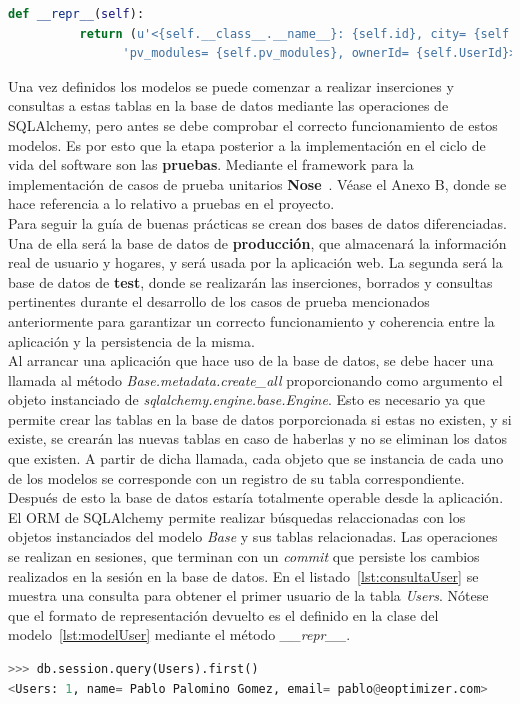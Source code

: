 \begin{itemize}
\begin{lstlisting}[language=Python,float=ht,caption={Modelo \textit{Home}},label={lst:modelHome}]
      def __repr__(self):
          return (u'<{self.__class__.__name__}: {self.id}, city= {self.city_code}, ' \
                'pv_modules= {self.pv_modules}, ownerId= {self.UserId}>'.format(self=self))
\end{lstlisting}
\end{itemize}
Una vez definidos los modelos se puede comenzar a realizar inserciones y consultas a estas tablas en la base de datos mediante las operaciones de SQLAlchemy, pero antes se debe comprobar el correcto funcionamiento de estos modelos. Es por esto que la etapa posterior a la implementación en el ciclo de vida del software son las \textbf{pruebas}. Mediante el framework para la implementación de casos de prueba unitarios \textbf{Nose}~\cite{Nose}. Véase el Anexo B, donde se hace referencia a lo relativo a pruebas en el proyecto.\\

Para seguir la guía de buenas prácticas se crean dos bases de datos diferenciadas. Una de ella será la base de datos de \textbf{producción}, que almacenará la información real de usuario y hogares, y será usada por la aplicación web. La segunda será la base de datos de \textbf{test}, donde se realizarán las inserciones, borrados y consultas pertinentes durante el desarrollo de los casos de prueba mencionados anteriormente para garantizar un correcto funcionamiento y coherencia entre la aplicación y la persistencia de la misma.\\

Al arrancar una aplicación que hace uso de la base de datos, se debe hacer una llamada al método \textit{Base.metadata.create\_all} proporcionando como argumento el objeto instanciado de \textit{sqlalchemy.engine.base.Engine}. Esto es necesario ya que permite crear las tablas en la base de datos porporcionada si estas no existen, y si existe, se crearán las nuevas tablas en caso de haberlas y no se eliminan los datos que existen. A partir de dicha llamada, cada objeto que se instancia de cada uno de los modelos se corresponde con un registro de su tabla correspondiente. Después de esto la base de datos estaría totalmente operable desde la aplicación. El ORM de SQLAlchemy permite realizar búsquedas relaccionadas con los objetos instanciados del modelo \textit{Base} y sus tablas relacionadas. Las operaciones se realizan en sesiones, que terminan con un \textit{commit} que persiste los cambios realizados en la sesión en la base de datos. En el listado~\ref{lst:consultaUser} se muestra una consulta para obtener el primer usuario de la tabla \textit{Users}. Nótese que el formato de representación devuelto es el definido en la clase del modelo~\ref{lst:modelUser} mediante el método \textit{\_\_repr\_\_}.
\begin{lstlisting}[language=Python,float=ht,numbers=none,caption={Consulta para obtener el primer \textit{User}},label={lst:consultaUser}]
>>> db.session.query(Users).first()
<Users: 1, name= Pablo Palomino Gomez, email= pablo@eoptimizer.com>
\end{lstlisting}

